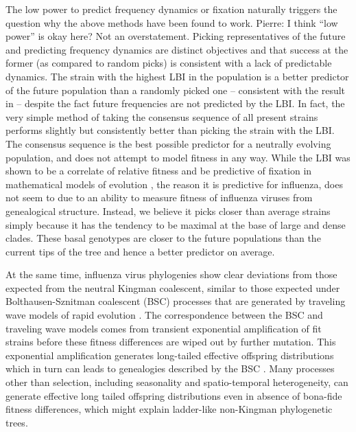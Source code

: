\documentclass[reprint,amsmath,amssymb,superscriptaddress,showpacs,pre]{revtex4-1}
\newcommand{\pierre}[1]{{\color{red}Pierre: #1}}
\begin{document}
The low power to predict frequency dynamics or fixation naturally triggers the question why the above methods have been found to work. \pierre{I think ``low power'' is okay here? Not an overstatement.}
Picking representatives of the future and predicting frequency dynamics are distinct objectives and that success at the former (as compared to random picks) is consistent with a lack of predictable dynamics.
The strain with the highest LBI in the population is a better predictor of the future population than a randomly picked one -- consistent with the result in \citep{neher_predicting_2014} -- despite the fact future frequencies are not predicted by the LBI.
In fact, the very simple method of taking the consensus sequence of all present strains performs slightly but consistently better than picking the strain with the LBI. 
The consensus sequence is the best possible predictor for a neutrally evolving population, and does not attempt to model fitness in any way. 
While the LBI was shown to be a correlate of relative fitness and be predictive of fixation in mathematical models of evolution \citep{neher_predicting_2014}, the reason it is predictive for influenza, does not seem to due to an ability to measure fitness of influenza viruses from genealogical structure.
Instead, we believe it picks closer than average strains simply because it has the tendency to be maximal at the base of large and dense clades. 
These basal genotypes are closer to the future populations than the current tips of the tree and hence a better predictor on average.

At the same time, influenza virus phylogenies show clear deviations from those expected from the neutral Kingman coalescent, similar to those expected under Bolthausen-Sznitman coalescent (BSC) processes that are generated by traveling wave models of rapid evolution \citep{neher_genealogies_2013,desai_genetic_2013}.
The correspondence between the BSC and traveling wave models comes from transient exponential amplification of fit strains before these fitness differences are wiped out by further mutation. 
This exponential amplification generates long-tailed effective offspring distributions which in turn can leads to genealogies described by the BSC \citep{schweinsberg_coalescent_2003,neher_genealogies_2013}. 
Many processes other than selection, including seasonality and spatio-temporal heterogeneity, can generate effective long tailed offspring distributions even in absence of bona-fide fitness differences, which might explain ladder-like non-Kingman phylogenetic trees.
\end{document}
